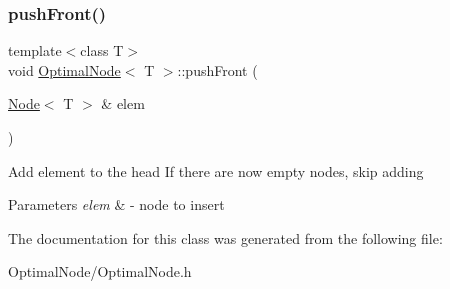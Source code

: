 \subsubsection{\texorpdfstring{push\+Front()}{pushFront()}}
{\footnotesize\ttfamily template$<$class T$>$ \\
void \hyperlink{classOptimalList}{Optimal\+Node}$<$ T $>$\+::push\+Front (\begin{DoxyParamCaption}\item[{\hyperlink{classList}{Node}$<$ T $>$ \&}]{elem }\end{DoxyParamCaption})\hspace{0.3cm}{\ttfamily [inline]}}

Add element to the head If there are now empty nodes, skip adding 
\begin{DoxyParams}{Parameters}
{\em elem} & -\/ node to insert \\
\hline
\end{DoxyParams}


The documentation for this class was generated from the following file\+:\begin{DoxyCompactItemize}
\item 
Optimal\+Node/Optimal\+Node.\+h\end{DoxyCompactItemize}
